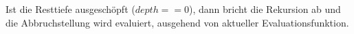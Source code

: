 Ist die Resttiefe ausgeschöpft ($depth == 0$), dann bricht die Rekursion ab und die Abbruchstellung wird evaluiert, ausgehend von aktueller Evaluationsfunktion.\\
%
%	
%
%	
